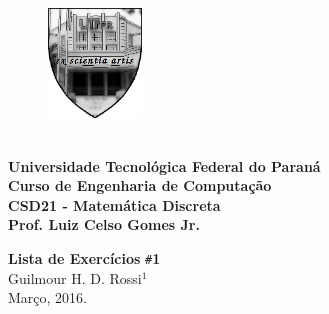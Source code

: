 \documentclass[12pt, a4paper]{article}
\title{Lista de Exercícios #1}
\author{Guilmour Rossi}
\date{Março, 2016}
\begin{document}
     

\begin{minipage}{20cm}
\begin{figure}
\includegraphics[width=2.5cm]{ex_scientia_artis.png}  
\end{figure}

\textbf{\\Universidade Tecnológica Federal do Paraná\\
	Curso de Engenharia de Computação\\
    CSD21 - Matemática Discreta \\
    Prof. Luiz Celso Gomes Jr.      \\}

\end{minipage}


	\vskip15mm
	    
    
       \begin{flushright}
       
      

        \textbf{Lista de Exercícios} \texttt{\#}\textbf{1} 
		{\\Guilmour H. D. Rossi\texttt{$^1$} \\}
        {Março, 2016.\\}		        
   \end{flushright}  
   
\end{document}
